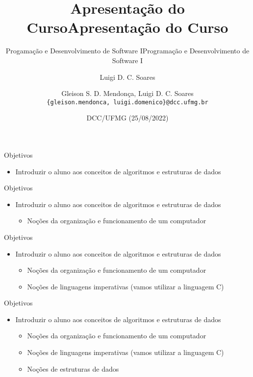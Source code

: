 \documentclass[t, aspectratio=169]{beamer}
\author{Luigi D. C. Soares}
\date{DCC/UFMG (25/08/2022)}
\title{Apresentação do Curso}
\subtitle{Progamação e Desenvolvimento de Software I}
\title[Apresentação do Curso]{Apresentação do Curso}
\subtitle{Programação e Desenvolvimento de Software I}
\author[\tiny\{gleison.mendonca, luigi.domenico\}@dcc.ufmg.br]{%
Gleison S. D. Mendonça, Luigi D. C. Soares\texorpdfstring{\\}{}
\texttt{\{gleison.mendonca, luigi.domenico\}@dcc.ufmg.br}}
\institute[DCC/UFMG]{}
\date[25/08/2022]{}
\begin{document}
\maketitle


\begin{frame}[label={sec:orgfdcf03a}]{Objetivos}
\begin{itemize}
\item Introduzir o aluno aos conceitos de \alert{algoritmos} e \alert{estruturas de dados}
\end{itemize}
\end{frame}

\begin{frame}[label={sec:org4172ff5}]{Objetivos}
\begin{itemize}
\item Introduzir o aluno aos conceitos de \alert{algoritmos} e \alert{estruturas de dados}
\begin{itemize}
\item Noções da organização e funcionamento de um computador
\end{itemize}
\end{itemize}
\end{frame}

\begin{frame}[label={sec:orgededcc9}]{Objetivos}
\begin{itemize}
\item Introduzir o aluno aos conceitos de \alert{algoritmos} e \alert{estruturas de dados}
\begin{itemize}
\item Noções da organização e funcionamento de um computador
\item Noções de linguagens imperativas (vamos utilizar a linguagem C)
\end{itemize}
\end{itemize}
\end{frame}

\begin{frame}[label={sec:org2194848}]{Objetivos}
\begin{itemize}
\item Introduzir o aluno aos conceitos de \alert{algoritmos} e \alert{estruturas de dados}
\begin{itemize}
\item Noções da organização e funcionamento de um computador
\item Noções de linguagens imperativas (vamos utilizar a linguagem C)
\item Noções de estruturas de dados
\end{itemize}
\end{itemize}
\end{frame}
\end{document}
